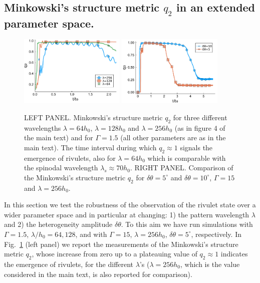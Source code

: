 \subsection{Minkowski's structure metric \texorpdfstring{$q_2$}{hmm} in an extended parameter space.}
\begin{figure}
    \centering
    \includegraphics[width=0.45\textwidth]{graphics/SupMatFig_1.pdf}
    \includegraphics[width=0.45\textwidth]{graphics/SupMatFig_2.pdf}
    \caption{LEFT PANEL. Minkowski's structure metric $q_2$ for three different wavelengths $\lambda=64 h_0$, $\lambda=128 h_0$ and $\lambda=256 h_0$ (as in figure 4 of the main text) and for $\Gamma=1.5$ (all other parameters are as in the main text). 
    The time interval during which $q_2 \approx 1$ signals the emergence of rivulets, also for $\lambda = 64 h_0$ which is comparable with the spinodal wavelength $\lambda_s \approx 70 h_0$. 
    RIGHT PANEL. Comparison of the Minkowski's structure metric $q_2$ for $\delta\theta=5^{\circ}$ and $\delta\theta=10^{\circ}$, $\Gamma = 15$ and $\lambda = 256 h_0$.}
    \label{fig:q2_difflambda}
\end{figure}
\noindent In this section we test the robustness of the observation of the rivulet state over a wider parameter space and in particular at changing: 1) the 
pattern wavelength $\lambda$ and 2) the heterogeneity amplitude $\delta \theta$.
To this aim we have run simulations with $\Gamma=1.5$, $\lambda/h_0 = 64, 128$, and with $\Gamma = 15$, $\lambda = 256 h_0$, $\delta \theta = 5^{\circ}$, respectively.
In Fig.~\ref{fig:q2_difflambda} (left panel) we report the measurements of the Minkowski's structure metric $q_2$, whose increase from zero up to a plateauing value of $q_2 \approx 1$ indicates the emergence of rivulets, for the different $\lambda$'s ($\lambda=256 h_0$, which is the value considered in the main text, is also reported for comparison).
